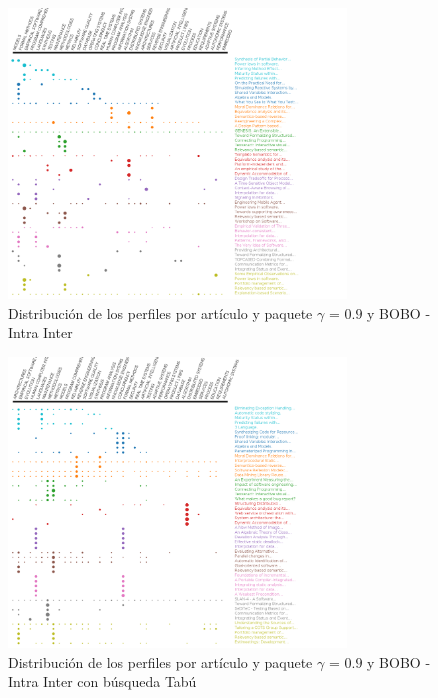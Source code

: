 \begin{figure}[H]
  \centering
    \includegraphics[width=0.8\textwidth]{resultados/papers/BOBO/INTRA_INTER/gamma-09.png}
  \caption{Distribución de los perfiles por artículo y paquete $\gamma$ = $0.9$ y BOBO - Intra Inter}
  \label{res:img-papers-gamma09-bobo-intra-inter}
\end{figure}

\begin{figure}[H]
  \centering
    \includegraphics[width=0.8\textwidth]{resultados/papers/BOBO/INTRA_INTER/gamma-with-local-09.png}
  \caption{Distribución de los perfiles por artículo y paquete $\gamma$ = $0.9$ y BOBO - Intra Inter con búsqueda Tabú}
  \label{res:img-papers-gamma09-bobo-intra-inter-tabu}
\end{figure}

